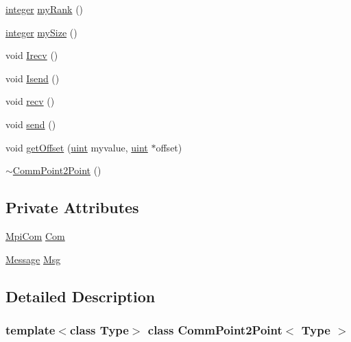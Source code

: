 \begin{DoxyCompactItemize}
\mbox{\hyperlink{definitions_8h_adbd822dbdb8152553a0f77b84915bd8d}{integer}} \mbox{\hyperlink{classCommPoint2Point_aea7be5ce3b1dcd98c6d02c165be9867c}{my\+Rank}} ()
\item 
\mbox{\hyperlink{definitions_8h_adbd822dbdb8152553a0f77b84915bd8d}{integer}} \mbox{\hyperlink{classCommPoint2Point_a7b2195c888a452f25f1567fa1006459e}{my\+Size}} ()
\item 
void \mbox{\hyperlink{classCommPoint2Point_a91a4f9779a315269bd95543254bfe0ff}{Irecv}} ()
\item 
void \mbox{\hyperlink{classCommPoint2Point_a6415fa1d951388ab158d441539337ed0}{Isend}} ()
\item 
void \mbox{\hyperlink{classCommPoint2Point_a98dd7b3bbe9cb5b603d9bb29371eb7db}{recv}} ()
\item 
void \mbox{\hyperlink{classCommPoint2Point_a974ce073715ec520a0c56f003cb8a1b0}{send}} ()
\item 
void \mbox{\hyperlink{classCommPoint2Point_a9093c564a679e5df134859ed3841a84c}{get\+Offset}} (\mbox{\hyperlink{definitions_8h_a69aa29b598b851b0640aa225a9e5d61d}{uint}} myvalue, \mbox{\hyperlink{definitions_8h_a69aa29b598b851b0640aa225a9e5d61d}{uint}} $\ast$offset)
\item 
\mbox{\hyperlink{classCommPoint2Point_ad2f7721e07287b51cf589d03c1165966}{$\sim$\+Comm\+Point2\+Point}} ()
\end{DoxyCompactItemize}
\subsection*{Private Attributes}
\begin{DoxyCompactItemize}
\item 
\mbox{\hyperlink{structMpiCom}{Mpi\+Com}} \mbox{\hyperlink{classCommPoint2Point_a992996e177ca0ae1096da26abad93915}{Com}}
\item 
\mbox{\hyperlink{structMessage}{Message}} \mbox{\hyperlink{classCommPoint2Point_ab3b02cefcb07c7d4dbd0ce262d5eb6bd}{Msg}}
\end{DoxyCompactItemize}


\subsection{Detailed Description}
\subsubsection*{template$<$class Type$>$\newline
class Comm\+Point2\+Point$<$ Type $>$}


